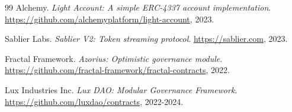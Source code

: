 \begin{thebibliography}{99}
Alchemy.
\textit{Light Account: A simple ERC-4337 account implementation}.
\url{https://github.com/alchemyplatform/light-account}, 2023.

Sablier Labs.
\textit{Sablier V2: Token streaming protocol}.
\url{https://sablier.com}, 2023.

Fractal Framework.
\textit{Azorius: Optimistic governance module}.
\url{https://github.com/fractal-framework/fractal-contracts}, 2022.

Lux Industries Inc.
\textit{Lux DAO: Modular Governance Framework}.
\url{https://github.com/luxdao/contracts}, 2022-2024.

\end{thebibliography}

